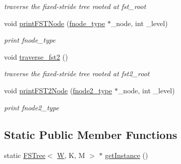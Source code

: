 \begin{DoxyCompactItemize}
\begin{DoxyCompactList}\small\item\em traverse the fixed-\/stride tree rooted at fst\-\_\-root \end{DoxyCompactList}\item 
void \hyperlink{classFSTree_aa12c77a41e50d5ef6f98ceaa91d57f87}{print\-F\-S\-T\-Node} (\hyperlink{classFSTree_a67d384ab5a196299d83dde842299fe7f}{fnode\-\_\-type} $\ast$\-\_\-node, int \-\_\-level)
\begin{DoxyCompactList}\small\item\em print fnode\-\_\-type \end{DoxyCompactList}\item 
void \hyperlink{classFSTree_aad9ae75065c09d65f7efaf99cc8c64c1}{traverse\-\_\-fst2} ()
\begin{DoxyCompactList}\small\item\em traverse the fixed-\/stride tree rooted at fst2\-\_\-root \end{DoxyCompactList}\item 
void \hyperlink{classFSTree_a19bc57d1746a90c73645702ceeeb7daf}{print\-F\-S\-T2\-Node} (\hyperlink{classFSTree_ae109ec54da0c7eb682ab08c8f8bc615c}{fnode2\-\_\-type} $\ast$\-\_\-node, int \-\_\-level)
\begin{DoxyCompactList}\small\item\em print fnode2\-\_\-type \end{DoxyCompactList}\end{DoxyCompactItemize}
\subsection*{Static Public Member Functions}
\begin{DoxyCompactItemize}
\item 
static \hyperlink{classFSTree}{F\-S\-Tree}$<$ \hyperlink{test__u128_8cpp_ab21b528bc38899d04d3a7053e52fb797}{W}, K, M $>$ $\ast$ \hyperlink{classFSTree_a478b9f5acec1f387e16f729f317d217e}{get\-Instance} ()
\end{DoxyCompactItemize}
